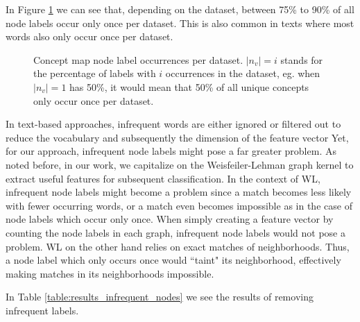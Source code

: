 In Figure \ref{fig:percentage_distribution_concept_occurrences} we can see that, depending on the dataset, between 75\% to 90\% of all node labels occur only once per dataset.
This is also common in texts where most words also only occur once per dataset.
 
\begin{figure}[htb!]
    \caption[Statistics: Distribution concept occurrence]{Concept map node label occurrences per dataset. $|n_v| = i$ stands for the percentage of labels with $i$ occurrences in the dataset, eg. when $|n_v| = 1$ has 50\%, it would mean that 50\% of all unique concepts only occur once per dataset.}\label{fig:percentage_distribution_concept_occurrences}
\end{figure}

In text-based approaches, infrequent words are either ignored or filtered out to reduce the vocabulary and subsequently the dimension of the feature vector
Yet, for our approach, infrequent node labels might pose a far greater problem.
As noted before, in our work, we capitalize on the Weisfeiler-Lehman graph kernel to extract useful features for subsequent classification.
In the context of WL, infrequent node labels might become a problem since a match becomes less likely with fewer occurring words, or a match even becomes impossible as in the case of node labels which occur only once.
When simply creating a feature vector by counting the node labels in each graph, infrequent node labels would not pose a problem.
WL on the other hand relies on exact matches of neighborhoods.
Thus, a node label which only occurs once would ``taint" its neighborhood, effectively making matches in its neighborhoods impossible.

In Table \ref{table:results_infrequent_nodes} we see the results of removing infrequent labels.


